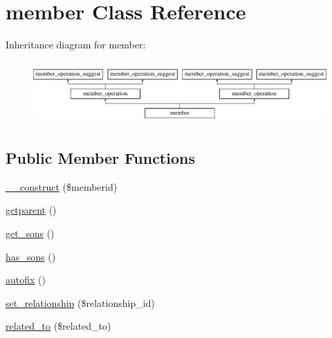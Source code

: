 \hypertarget{classmember}{\section{member Class Reference}
\label{classmember}
}
Inheritance diagram for member\-:\begin{figure}[H]
\begin{center}
\leavevmode
\includegraphics[height=2.413793cm]{classmember}
\end{center}
\end{figure}
\subsection*{Public Member Functions}
\begin{DoxyCompactItemize}
\item 
\hyperlink{classmember_aa2427c65795ffbdc72d64e2e91640463}{\-\_\-\-\_\-construct} (\$memberid)
\item 
\hyperlink{classmember_ac331cc43c8c076314d05ac004d20e021}{getparent} ()
\item 
\hyperlink{classmember_af0d9a69479f2b9c859acb90e97bad85c}{get\-\_\-sons} ()
\item 
\hyperlink{classmember_a024f7356f2279490775b6ae432d51010}{has\-\_\-sons} ()
\item 
\hyperlink{classmember_a45c3ed97d49c45ce716892b4b5e44bd2}{autofix} ()
\item 
\hyperlink{classmember_ae0f93137fb23a9f5ae9e6a287f6232dd}{set\-\_\-relationship} (\$relationship\-\_\-id)
\item 
\hyperlink{classmember_a541afd2c1c096f5810c0b889e33287ba}{related\-\_\-to} (\$related\-\_\-to)
\end{DoxyCompactItemize}
